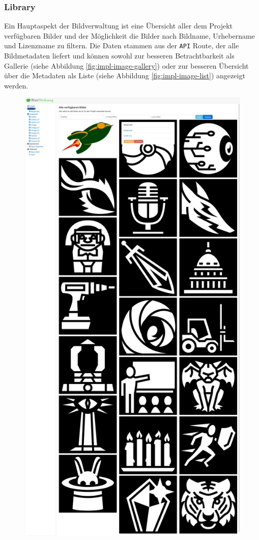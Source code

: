 \subsubsection{Library}
\label{subsec:4-image-library}

Ein Hauptaspekt der Bildverwaltung ist eine Übersicht aller dem Projekt
verfügbaren Bilder und der Möglichkeit die Bilder nach Bildname, Urhebername und
Lizenzname zu filtern. Die Daten stammen aus der \texttt{API} Route, der alle
Bildmetadaten liefert und können sowohl zur besseren Betrachtbarkeit als
Gallerie (siehe Abbildung \ref{fig:impl-image-gallery}) oder zur besseren
Übersicht über die Metadaten als Liste (siehe Abbildung
\ref{fig:impl-image-list}) angezeigt werden.

\begin{figure}
  \centering
  \includegraphics[height=0.95\textheight]{images/screenshot-image-gallery.png}

\end{figure}

